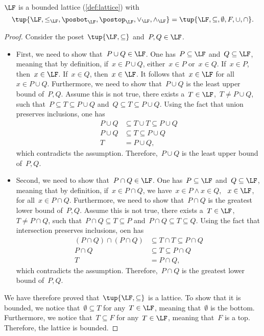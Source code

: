 \begin{lemma}
  $\LF$ is a bounded lattice (\cref{def:lattice}) with
  \begin{equation}
    \tup{\LF,\leq_{\LF},\posbot_{\LF},\postop_{\LF},\vee_{\LF},\wedge_{\LF}}=\tup{\LF,\subseteq,\emptyset,F,\cup,\cap}.
  \end{equation}
\end{lemma}
\begin{proof}
  Consider the poset~$\tup{\LF,\subseteq}$ and~$P,Q\in \LF$.
  \begin{itemize}
    \item First, we need to show that~$P\cup Q\in \LF$. One has~$P \subseteq \LF$ and~$Q\subseteq \LF$, meaning that by definition, if~$x\in P\cup Q$, either~$x\in P$ or~$x\in Q$. If~$x\in P$, then~$x\in \LF$. If~$x\in Q$, then~$x\in \LF$. It follows that~$x\in \LF$ for all~$x\in P\cup Q$. Furthermore, we need to show that~$P\cup Q$ is the least upper bound of~$P,Q$. Assume this is not true, \ie  there exists a~$T\in \LF$,~$T\neq P\cup Q$, such that~$P\subseteq T\subseteq P\cup Q$ and~$Q\subseteq T\subseteq P\cup Q$. Using the fact that union preserves inclusions, one has
    \begin{equation}
      \begin{aligned}
        P\cup Q &\subseteq T\cup T \subseteq P\cup Q\\
        P\cup Q &\subseteq T \subseteq P\cup Q\\
        T&= P\cup Q,
      \end{aligned}
    \end{equation}
    which contradicts the assumption. Therefore,~$P\cup Q$ is the least upper bound of~$P,Q$.
    \item Second, we need to show that~$P\cap Q\in \LF$. One has~$P\subseteq \LF$ and~$Q\subseteq \LF$, meaning that by definition, if~$x\in P\cap Q$, we have~$x\in P\wedge x\in Q$, \ie ~$x\in \LF$, for all~$x\in P\cap Q$. Furthermore, we need to show that~$P\cap Q$ is the greatest lower bound of~$P,Q$. Assume this is not true, \ie  there exists a~$T\in \LF$,~$T\neq P\cap Q$, such that~$P\cap Q\subseteq T\subseteq P$ and~$P\cap Q\subseteq T\subseteq Q$. Using the fact that intersection preserves inclusions, oen has
    \begin{equation}
      \begin{aligned}
      (P\cap Q)
        \cap (P\cap Q) &\subseteq T \cap T \subseteq P\cap Q\\
        P\cap Q &\subseteq T\subseteq P\cap Q\\
        T&=P\cap Q,
      \end{aligned}
    \end{equation}
    which contradicts the assumption. Therefore,~$P\cap Q$ is the greatest lower bound of~$P,Q$.
  \end{itemize}
  We have therefore proved that~$\tup{\LF,\subseteq}$ is a lattice. To show that it is bounded, we notice that~$\emptyset \subseteq T$ for any~$T\in \LF$, meaning that~$\emptyset$ is the bottom. Furthermore, we notice that~$T\subseteq F$ for any~$T\in \LF$, meaning that~$F$ is a top. Therefore, the lattice is bounded.
\end{proof}
